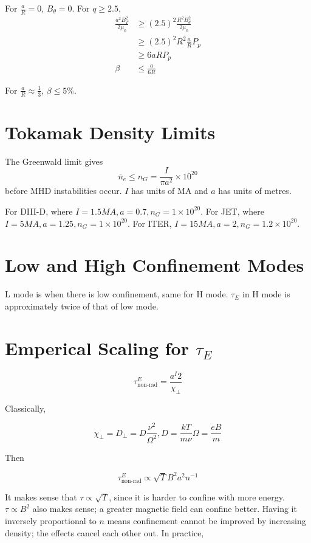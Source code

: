 \documentclass[12pt]{article}
\begin{document}
For $\frac{a}{R} = 0$, $B_\theta = 0$. For $q \geq 2.5$,
\begin{align*}
    \frac{a^2B_T^2}{2\mu_0} &\geq (2.5)^2\frac{R^2B_\theta^2}{2\mu_0} \\
                            &\geq (2.5)^2R^2 \frac{a}{R} P_p \\
                            &\geq 6aRP_p \\
    \beta &\leq \frac{a}{6R}
\end{align*}

For $\frac{a}{R} \approx \frac{1}{3}$, $\beta \leq 5\%$.

\section{Tokamak Density Limits}

The Greenwald limit gives
$$\overline n_e \leq n_G = \frac{I}{\pi a^2} \times 10^{20}$$
before MHD instabilities occur. $I$ has units of MA and $a$ has units of metres.

\begin{ex}
    For DIII-D, where $I = 1.5 \unit{MA}, a = 0.7, n_G = 1 \times 10^{20}$. For JET, where $I = 5\unit{MA}, a = 1.25, n_G = 1 \times 10^{20}$. For ITER, $I = 15\unit{MA}, a = 2, n_G = 1.2 \times 10^{20}$.
\end{ex}

\section{Low and High Confinement Modes}

L mode is when there is low confinement, same for H mode. $\tau_E$ in H mode is approximately twice of that of low mode.

\section{Emperical Scaling for $\tau_E$}

$$\tau^E_{\text{non-rad}} = \frac{a^I2}{\chi_\perp}$$

Classically,

$$\chi_\perp = D_\perp = D\frac{\nu^2}{\Omega^2}, D = \frac{kT}{m\nu} \Omega = \frac{eB}{m}$$

Then

$$\tau^E_{\text{non-rad}} \propto \sqrt T B^2 a^2 n^{-1}$$

It makes sense that $\tau \propto \sqrt T$, since it is harder to confine with more energy. $\tau \propto B^2$ also makes sense; a greater magnetic field can confine better. Having it inversely proportional to $n$ means confinement cannot be improved by increasing density; the effects cancel each other out. In practice,
\end{document}
